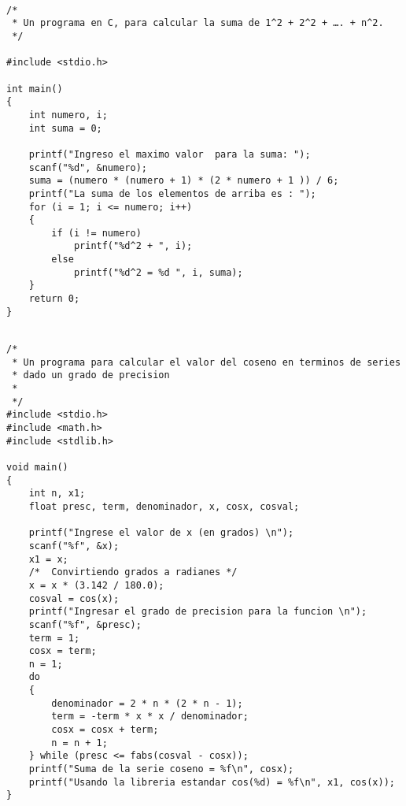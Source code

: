 \documentclass[twoside,10.5pt]{article}%
\begin{document}
\vspace{0.5cm}

\begin{verbatim}

/*
 * Un programa en C, para calcular la suma de 1^2 + 2^2 + …. + n^2.
 */

#include <stdio.h>
 
int main()
{
    int numero, i;
    int suma = 0;
 
    printf("Ingreso el maximo valor  para la suma: ");
    scanf("%d", &numero);
    suma = (numero * (numero + 1) * (2 * numero + 1 )) / 6;
    printf("La suma de los elementos de arriba es : ");
    for (i = 1; i <= numero; i++)
    {
        if (i != numero)
            printf("%d^2 + ", i);
        else
            printf("%d^2 = %d ", i, suma);
    }
    return 0;
}

\end{verbatim}
\vspace{0.5cm}

\begin{verbatim}

/*
 * Un programa para calcular el valor del coseno en terminos de series
 * dado un grado de precision
 * 
 */
#include <stdio.h>
#include <math.h>
#include <stdlib.h>
 
void main()
{
    int n, x1;
    float presc, term, denominador, x, cosx, cosval;
 
    printf("Ingrese el valor de x (en grados) \n");
    scanf("%f", &x);
    x1 = x;
    /*  Convirtiendo grados a radianes */
    x = x * (3.142 / 180.0);
    cosval = cos(x);
    printf("Ingresar el grado de precision para la funcion \n");
    scanf("%f", &presc);
    term = 1;
    cosx = term;
    n = 1;
    do
    {
        denominador = 2 * n * (2 * n - 1);
        term = -term * x * x / denominador;
        cosx = cosx + term;
        n = n + 1;
    } while (presc <= fabs(cosval - cosx));
    printf("Suma de la serie coseno = %f\n", cosx);
    printf("Usando la libreria estandar cos(%d) = %f\n", x1, cos(x));
}
\end{verbatim}
\end{document}
